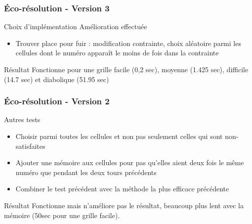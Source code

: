 \begin{frame}
    \frametitle{Éco-résolution - Version 3}
    \begin{block}{Choix d'implémentation}
    		Amélioration effectuée
    		\begin{itemize}
    			\item Trouver place pour fuir : modification contrainte, choix aléatoire parmi les cellules dont le numéro apparaît le moins de fois dans la contrainte
    		\end{itemize}
    \end{block}
    \pause
    \begin{alertblock}{Résultat}
    		Fonctionne pour une grille facile (0,2 sec), moyenne (1.425 sec), difficile (14.7 sec) et diabolique (51.95 sec)
    \end{alertblock}
\end{frame}


\begin{frame}
    \frametitle{Éco-résolution - Version 2}
    \begin{exampleblock}{Autres tests}
   		 \begin{itemize}
    				\item Choisir parmi toutes les cellules et non pas seulement celles qui sont non-satisfaites
    		 \pause
    				\item Ajouter une mémoire aux cellules pour pas qu'elles aient deux fois le même numéro que pendant les deux tours précédents 
		 \pause
				\item Combiner le test précédent avec la méthode la plus efficace précédente
		 \end{itemize}
	\end{exampleblock}
	\pause
	\begin{alertblock}{Résultat}
		Fonctionne mais n'améliore pas le résultat, beaucoup plus lent avec la mémoire (50sec pour une grille facile).
    \end{alertblock}
\end{frame}